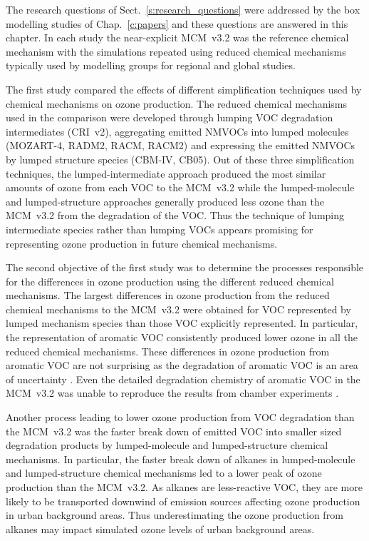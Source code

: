 The research questions of Sect.~\ref{s:research_questions} were addressed by the box modelling studies of Chap.~\ref{c:papers} and these questions are answered in this chapter.
In each study the near-explicit MCM~v3.2 was the reference chemical mechanism with the simulations repeated using reduced chemical mechanisms typically used by modelling groups for regional and global studies.

The first study compared the effects of different simplification techniques used by chemical mechanisms on ozone production.
The reduced chemical mechanisms used in the comparison were developed through lumping VOC degradation intermediates (CRI~v2), aggregating emitted NMVOCs into lumped molecules (MOZART-4, RADM2, RACM, RACM2) and expressing the emitted NMVOCs by lumped structure species (CBM-IV, CB05).
Out of these three simplification techniques, the lumped-intermediate approach produced the most similar amounts of ozone from each VOC to the MCM~v3.2 while the lumped-molecule and lumped-structure approaches generally produced less ozone than the MCM~v3.2 from the degradation of the VOC.
Thus the technique of lumping intermediate species rather than lumping VOCs appears promising for representing ozone production in future chemical mechanisms.

The second objective of the first study was to determine the processes responsible for the differences in ozone production using the different reduced chemical mechanisms.
The largest differences in ozone production from the reduced chemical mechanisms to the MCM~v3.2 were obtained for VOC represented by lumped mechanism species than those VOC explicitly represented.
In particular, the representation of aromatic VOC consistently produced lower ozone in all the reduced chemical mechanisms.
These differences in ozone production from aromatic VOC are not surprising as the degradation of aromatic VOC is an area of uncertainty \citep{Atkinson:2003}.
Even the detailed degradation chemistry of aromatic VOC in the MCM~v3.2 was unable to reproduce the results from chamber experiments \citep{Bloss:2005}.

Another process leading to lower ozone production from VOC degradation than the MCM~v3.2 was the faster break down of emitted VOC into smaller sized degradation products by lumped-molecule and lumped-structure chemical mechanisms.
In particular, the faster break down of alkanes in lumped-molecule and lumped-structure chemical mechanisms led to a lower peak of ozone production than the MCM~v3.2.
As alkanes are less-reactive VOC, they are more likely to be transported downwind of emission sources affecting ozone production in urban background areas.
Thus underestimating the ozone production from alkanes may impact simulated ozone levels of urban background areas.

